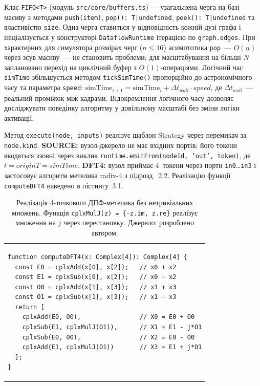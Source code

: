Клас \texttt{FIFO<T>} (модуль \texttt{src/core/buffers.ts}) --- узагальнена
черга на базі масиву з методами \texttt{push(item)},
\texttt{pop(): T|undefined}, \texttt{peek(): T|undefined} та властивістю
\texttt{size}. Одна черга ставиться у відповідність кожній дузі графа і
ініціалізується у конструкторі \texttt{DataflowRuntime} ітерацією по
\texttt{graph.edges}. При характерних для симулятора розмірах черг
(\(n\leq16\)) асимптотика \texttt{pop}~--- \(O(n)\) через зсув масиву~---
не становить проблеми; для масштабування на більші \(N\) заплановано
перехід на циклічний буфер з \(O(1)\)-операціями. Логічний час
\texttt{simTime} збільшується методом \texttt{tickSimTime()} пропорційно
до астрономічного часу та параметра \texttt{speed}:
\(\text{simTime}_{i+1}=\text{simTime}_{i}+\Delta t_{wall}\cdot speed\),
де \(\Delta t_{wall}\)~--- реальний проміжок між кадрами. Відокремлення
логічного часу дозволяє досліджувати поведінку алгоритму у довільному
масштабі без зміни логіки активації.

Метод \texttt{execute(node, inputs)} реалізує шаблон Strategy через
перемикач за \texttt{node.kind}. \textbf{SOURCE:} вузол-джерело не має
вхідних портів; його токени вводяться ззовні через виклик
\texttt{runtime.emitFrom(nodeId, 'out', token)}, де
\(t = originT = simTime\). \textbf{DFT4:} вузол приймає 4~токени через
порти \texttt{in0}\ldots\texttt{in3} і застосовує алгоритм метелика
radix-4 з підрозд.~2.2. Реалізацію функції \texttt{computeDFT4} наведено
в лістингу~3.1.

\begin{longtable}[]{@{}
  >{\raggedright\arraybackslash}p{}@{}}
\caption{Реалізація 4-точкового ДПФ-метелика без нетривіальних множень.
Функція \protect\texttt{cplxMulJ(z) = \{-z.im, z.re\}} реалізує
множення на \(j\) через перестановку. Джерело: розроблено
автором.}\tabularnewline
\toprule\noalign{}
\endfirsthead
\endhead
\bottomrule\noalign{}
\endlastfoot
\begin{minipage}[t]{\linewidth}\raggedright
\begin{verbatim}
function computeDFT4(x: Complex[4]): Complex[4] {
  const E0 = cplxAdd(x[0], x[2]);   // x0 + x2
  const E1 = cplxSub(x[0], x[2]);   // x0 - x2
  const O0 = cplxAdd(x[1], x[3]);   // x1 + x3
  const O1 = cplxSub(x[1], x[3]);   // x1 - x3
  return [
    cplxAdd(E0, O0),                // X0 = E0 + O0
    cplxSub(E1, cplxMulJ(O1)),      // X1 = E1 - j*O1
    cplxSub(E0, O0),                // X2 = E0 - O0
    cplxAdd(E1, cplxMulJ(O1))       // X3 = E1 + j*O1
  ];
}
\end{verbatim}
\end{minipage} \\
\end{longtable}

